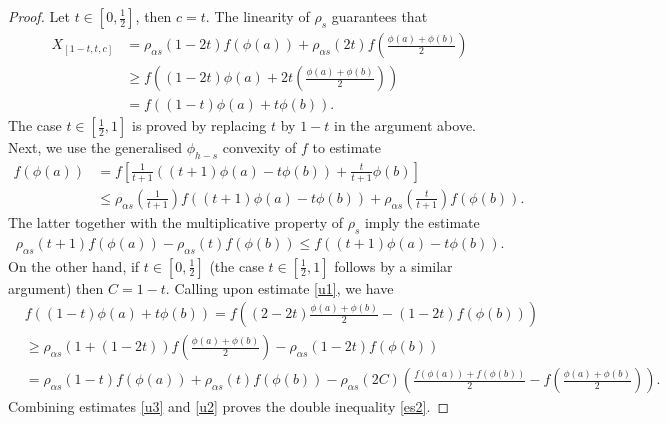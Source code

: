 \documentclass[10pt]{article}
\begin{document}
\begin{proof}
Let $t\in[0,\frac{1}{2}] $, then $c=t$. The linearity of $\rho_{ s}$ guarantees that
\begin{align}
X_{[1-t,t,c]} &=   \rho_{\alpha s}(1-2t)f(\phi(a)) +\rho_{\alpha s}(2t) f\left( \frac{\phi(a)+\phi(b)}{2}  \right)     \nonumber
\\&\geq f\left( (1-2t)\phi(a) +2t\left( \frac{\phi(a)+\phi(b)}{2} \right)  \right)       \nonumber
\\& = f((1-t)\phi(a)+ t\phi(b)).  \label{u2}
\end{align}
The case $t\in[\frac{1}{2}, 1]$ is proved by replacing $t$ by $1-t$ in the argument above. Next, we use the generalised $\phi_{h-s}$ convexity of $f$  to estimate 
\begin{align}
f(\phi(a))&= f\left[\frac{1}{t+1}((t+1)\phi(a)-t\phi(b) )+\frac{t}{t+1}\phi(b)   \right]  \nonumber
\\& \leq \rho_{\alpha s}\left(\frac{1}{t+1} \right) f((t+1)\phi(a) -t\phi(b)) +\rho_{\alpha s}\left( \frac{t}{t+1} \right) f(\phi(b)) .\nonumber
\end{align}
The latter together with the multiplicative property of $\rho_{ s}$   imply the estimate
\begin{align}
\rho_{\alpha s}(t+1) f(\phi(a)) -\rho_{\alpha s} (t) f(\phi(b)) \leq f((t+1) \phi(a) -t\phi(b)).\label{u1}
\end{align}
On the other hand, if $t\in[0,\frac{1}{2}]$ (the case $t\in[\frac{1}{2},1]$ follows by a similar argument) then $C= 1-t$. Calling upon estimate \eqref{u1}, we have
\begin{align}
 &f((1-t)\phi(a)+t\phi(b))=f\left((2-2t)\frac{\phi(a)+\phi(b)}{2} -(1-2t) f(\phi(b))   \right)  \nonumber
\\&\geq\rho_{\alpha s}(1+(1-2t)) f\left( \frac{\phi(a)+\phi(b)}{2} \right) -\rho_{\alpha s} (1-2t) f(\phi(b)) \nonumber
\\&=\rho_{\alpha s}(1-t)f(\phi(a)) +\rho_{\alpha s }(t) f(\phi(b)) -\rho_{\alpha s}(2C) \left(\frac{f(\phi(a))+ f(\phi(b))}{2}- f\left( \frac{\phi(a)+\phi(b)}{2}  \right)    \right) . \label{u3}
\end{align}
Combining estimates \eqref{u3} and \eqref{u2} proves the double inequality \eqref{es2}.


\end{proof}
\end{document}
